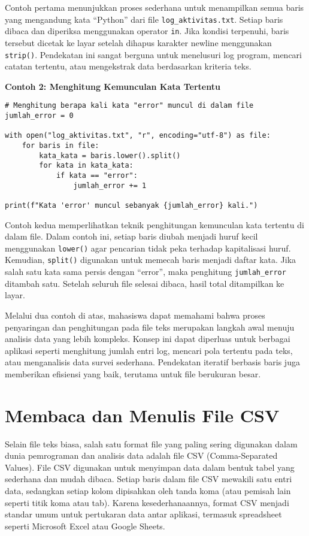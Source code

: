 Contoh pertama menunjukkan proses sederhana untuk menampilkan semua baris yang mengandung kata “Python” dari file \texttt{log_aktivitas.txt}. Setiap baris dibaca dan diperiksa menggunakan operator \texttt{in}. Jika kondisi terpenuhi, baris tersebut dicetak ke layar setelah dihapus karakter newline menggunakan \texttt{strip()}. Pendekatan ini sangat berguna untuk menelusuri log program, mencari catatan tertentu, atau mengekstrak data berdasarkan kriteria teks.

\noindent\textbf{Contoh 2: Menghitung Kemunculan Kata Tertentu}

\begin{lstlisting}[style=PythonStyle, caption={Menghitung jumlah kemunculan kata dalam file}]
# Menghitung berapa kali kata "error" muncul di dalam file
jumlah_error = 0

with open("log_aktivitas.txt", "r", encoding="utf-8") as file:
    for baris in file:
        kata_kata = baris.lower().split()
        for kata in kata_kata:
            if kata == "error":
                jumlah_error += 1

print(f"Kata 'error' muncul sebanyak {jumlah_error} kali.")
\end{lstlisting}

Contoh kedua memperlihatkan teknik penghitungan kemunculan kata tertentu di dalam file. Dalam contoh ini, setiap baris diubah menjadi huruf kecil menggunakan \texttt{lower()} agar pencarian tidak peka terhadap kapitalisasi huruf. Kemudian, \texttt{split()} digunakan untuk memecah baris menjadi daftar kata. Jika salah satu kata sama persis dengan “error”, maka penghitung \texttt{jumlah\_error} ditambah satu. Setelah seluruh file selesai dibaca, hasil total ditampilkan ke layar.

Melalui dua contoh di atas, mahasiswa dapat memahami bahwa proses penyaringan dan penghitungan pada file teks merupakan langkah awal menuju analisis data yang lebih kompleks. Konsep ini dapat diperluas untuk berbagai aplikasi seperti menghitung jumlah entri log, mencari pola tertentu pada teks, atau menganalisis data survei sederhana. Pendekatan iteratif berbasis baris juga memberikan efisiensi yang baik, terutama untuk file berukuran besar.


\section{Membaca dan Menulis File CSV}

Selain file teks biasa, salah satu format file yang paling sering digunakan dalam dunia pemrograman dan analisis data adalah file CSV (Comma-Separated Values). File CSV digunakan untuk menyimpan data dalam bentuk tabel yang sederhana dan mudah dibaca. Setiap baris dalam file CSV mewakili satu entri data, sedangkan setiap kolom dipisahkan oleh tanda koma (atau pemisah lain seperti titik koma atau tab). Karena kesederhanaannya, format CSV menjadi standar umum untuk pertukaran data antar aplikasi, termasuk spreadsheet seperti Microsoft Excel atau Google Sheets.

